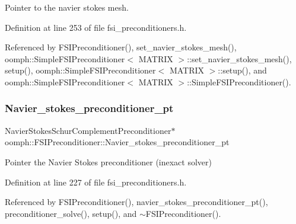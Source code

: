 Pointer to the navier stokes mesh. 



Definition at line 253 of file fsi\+\_\+preconditioners.\+h.



Referenced by F\+S\+I\+Preconditioner(), set\+\_\+navier\+\_\+stokes\+\_\+mesh(), oomph\+::\+Simple\+F\+S\+I\+Preconditioner$<$ M\+A\+T\+R\+I\+X $>$\+::set\+\_\+navier\+\_\+stokes\+\_\+mesh(), setup(), oomph\+::\+Simple\+F\+S\+I\+Preconditioner$<$ M\+A\+T\+R\+I\+X $>$\+::setup(), and oomph\+::\+Simple\+F\+S\+I\+Preconditioner$<$ M\+A\+T\+R\+I\+X $>$\+::\+Simple\+F\+S\+I\+Preconditioner().

\mbox{\label{classoomph_1_1FSIPreconditioner_adc98903b78d0bc97c40eb733eaf6e498}} 
\subsubsection{\texorpdfstring{Navier\+\_\+stokes\+\_\+preconditioner\+\_\+pt}{Navier\_stokes\_preconditioner\_pt}}
{\footnotesize\ttfamily Navier\+Stokes\+Schur\+Complement\+Preconditioner$\ast$ oomph\+::\+F\+S\+I\+Preconditioner\+::\+Navier\+\_\+stokes\+\_\+preconditioner\+\_\+pt\hspace{0.3cm}{\ttfamily [private]}}



Pointer the Navier Stokes preconditioner (inexact solver) 



Definition at line 227 of file fsi\+\_\+preconditioners.\+h.



Referenced by F\+S\+I\+Preconditioner(), navier\+\_\+stokes\+\_\+preconditioner\+\_\+pt(), preconditioner\+\_\+solve(), setup(), and $\sim$\+F\+S\+I\+Preconditioner().

\mbox{\label{classoomph_1_1FSIPreconditioner_ad8d4b031c62a4ec74fad432a6bf27346}} 
